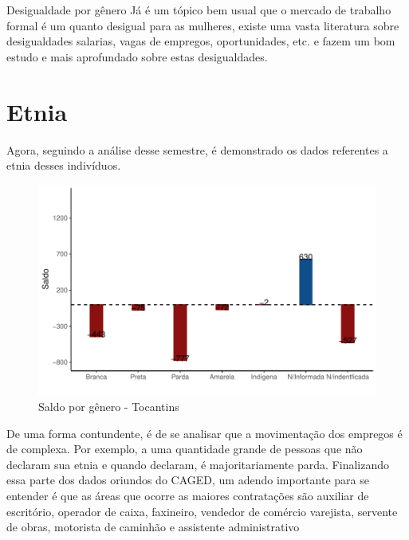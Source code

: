 \begin{smbox}[label={labelbox},nameref={Desigualdade por gênero}]{Desigualdade por gênero}
	Já é um tópico bem usual que o mercado de trabalho formal é um quanto desigual para as mulheres, existe uma vasta literatura sobre desigualdades salarias, vagas de empregos, oportunidades, etc. \cite{bibCotrim2020desigualdade} e \cite{bibHaussmann2018desigualdades} fazem um bom estudo e mais aprofundado sobre estas desigualdades.
\end{smbox}

\section{Etnia}
\par Agora, seguindo a análise desse semestre, é demonstrado os dados referentes a etnia desses indivíduos.

\begin{figure}[h]
	\caption{Saldo por gênero - Tocantins}
	\includegraphics[width=\linewidth]{fig/Saldo por etnia.pdf}
\end{figure}
\newpage
\par De uma forma contundente, é de se analisar que a movimentação dos empregos é de complexa. Por exemplo, a uma quantidade grande de pessoas que não declaram sua etnia e quando declaram, é majoritariamente parda. Finalizando essa parte dos dados oriundos do CAGED, um adendo importante para se entender é que as áreas que ocorre as maiores contratações são auxiliar de escritório, operador de caixa, faxineiro, vendedor de comércio varejista, servente de obras, motorista de caminhão e assistente administrativo

